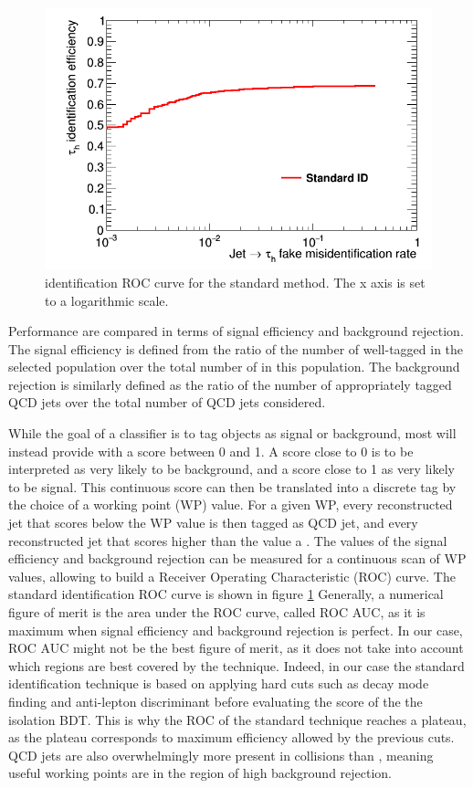 \begin{figure}
    \centering
    \includegraphics[width=\textwidth]{Images/std_ROC.png}
    \caption{\tauh identification ROC curve for the standard method. The x axis is set to a logarithmic scale.}
    \label{fig:std_ROC}
\end{figure}

Performance are compared in terms of signal efficiency and background rejection. The signal efficiency is defined from the ratio of the number of well-tagged \tauh in the selected population over the total number of \tauh in this population. The background rejection is similarly defined as the ratio of the number of appropriately tagged QCD jets over the total number of QCD jets considered.

While the goal of a classifier is to tag objects as signal or background, most will instead provide with a score between 0 and 1. A score close to 0 is to be interpreted as very likely to be background, and a score close to 1 as very likely to be signal. This continuous score can then be translated into a discrete tag by the choice of a working point (WP) value. For a given WP, every reconstructed jet that scores below the WP value is then tagged as QCD jet, and every reconstructed jet that scores higher than the value a \tauh. The values of the signal efficiency and background rejection can be measured for a continuous scan of WP values, allowing to build a Receiver Operating Characteristic (ROC) curve. The standard identification ROC curve is shown in figure \ref{fig:std_ROC}
Generally, a numerical figure of merit is the area under the ROC curve, called ROC AUC, as it is maximum when signal efficiency and background rejection is perfect.
In our case, ROC AUC might not be the best figure of merit, as it does not take into account which regions are best covered by the technique. Indeed, in our case the standard identification technique is based on applying hard cuts such as decay mode finding and anti-lepton discriminant before evaluating the score of the the isolation BDT. This is why the ROC of the standard technique reaches a plateau, as the plateau corresponds to maximum efficiency allowed by the previous cuts.
QCD jets are also overwhelmingly more present in collisions than \tauh, meaning useful working points are in the region of high background rejection. 

